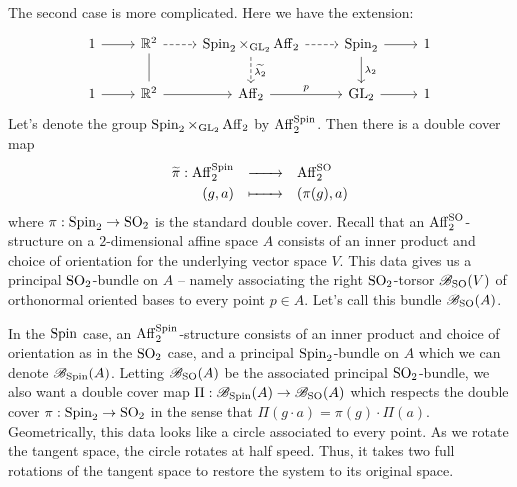 \documentclass{../../templates/lkx_pset}
\begin{document}
\begin{parts}
  The second case is more complicated. Here we have the extension:
	\[\begin{tikzcd}
			1 & {\R^2} & {\Spin_2\times_{\GL_2}\Aff_2} & {\Spin_2} & 1 \\
			1 & {\R^2} & {\Aff_2} & {\GL_2} & 1
			\arrow[from=1-1, to=1-2]
			\arrow[dashed, from=1-2, to=1-3]
			\arrow[no head, from=1-2, to=2-2]
			\arrow[dashed, from=1-3, to=1-4]
			\arrow["{\widetilde{\lambda_2}}", dashed, from=1-3, to=2-3]
			\arrow[from=1-4, to=1-5]
			\arrow["{\lambda_2}", from=1-4, to=2-4]
			\arrow[from=2-1, to=2-2]
			\arrow[from=2-2, to=2-3]
			\arrow["{p}", from=2-3, to=2-4]
			\arrow[from=2-4, to=2-5]
		\end{tikzcd}\]
		Let's denote the group $\operatorname{Spin}_2\times_{\operatorname{GL}_2}\operatorname{Aff}_2$ by $\operatorname{Aff}_2^{\operatorname{Spin}}$. Then there is a double cover map
		\[
        \definefunction{\widetilde{\pi}}{\Aff_2^{\Spin}}{\Aff_2^{\SO}}{(g, a)}{(\pi(g),a)}
		\]
		where $\pi : \operatorname{Spin}_2 \to \operatorname{SO}_2$ is the standard double cover. Recall that an $\operatorname{Aff}_2^{\operatorname{SO}}$-structure on a $2$-dimensional affine space $A$ consists of an inner product and choice of orientation for the underlying vector space $V$. This data gives us a principal $\operatorname{SO}_2$-bundle on $A$ -- namely associating the right $\operatorname{SO}_2$-torsor $\mathscr{B}_{\operatorname{SO}}(V)$ of orthonormal oriented bases to every point $p\in A$. Let's call this bundle $\mathscr{B}_{\operatorname{SO}}(A)$.

    In the $\operatorname{Spin}$ case, an $\operatorname{Aff}^{\operatorname{Spin}}_2$-structure consists of an inner product and choice of orientation as in the $\operatorname{SO}_2$ case, and a principal $\operatorname{Spin}_2$-bundle on $A$ which we can denote $\mathscr{B}_{\operatorname{Spin}}(A)$. Letting $\mathscr{B}_{\operatorname{SO}}(A)$ be the associated principal $\operatorname{SO}_2$-bundle, we also want a double cover map $\Pi : \mathscr{B}_{\operatorname{Spin}}(A) \to \mathscr{B}_{\operatorname{SO}}(A)$ which respects the double cover $\pi : \operatorname{Spin}_2 \to \operatorname{SO}_2$ in the sense that $\Pi(g\cdot a)=\pi(g)\cdot\Pi(a)$. Geometrically, this data looks like a circle associated to every point. As we rotate the tangent space, the circle rotates at half speed. Thus, it takes two full rotations of the tangent space to restore the system to its original space.
\end{parts}
\end{document}

